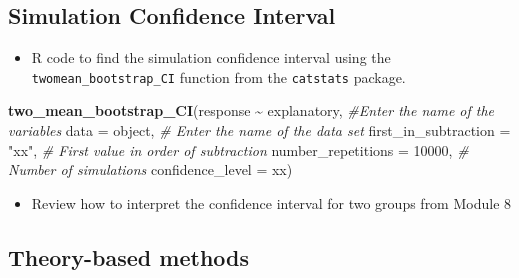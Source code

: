 \documentclass[
]{report}
\newenvironment{Shaded}{\begin{snugshade}}{\end{snugshade}}
\newcommand{\AttributeTok}[1]{\textcolor[rgb]{0.13,0.29,0.53}{#1}}
\newcommand{\CommentTok}[1]{\textcolor[rgb]{0.56,0.35,0.01}{\textit{#1}}}
\newcommand{\DecValTok}[1]{\textcolor[rgb]{0.00,0.00,0.81}{#1}}
\newcommand{\FunctionTok}[1]{\textcolor[rgb]{0.13,0.29,0.53}{\textbf{#1}}}
\newcommand{\NormalTok}[1]{#1}
\newcommand{\SpecialCharTok}[1]{\textcolor[rgb]{0.81,0.36,0.00}{\textbf{#1}}}
\newcommand{\StringTok}[1]{\textcolor[rgb]{0.31,0.60,0.02}{#1}}
\providecommand{\tightlist}{%
  \setlength{\itemsep}{0pt}\setlength{\parskip}{0pt}}
\begin{document}
\subsection*{Simulation Confidence Interval}\label{simulation-confidence-interval}

\begin{itemize}
\tightlist
\item
  R code to find the simulation confidence interval using the \texttt{twomean\_bootstrap\_CI} function from the \texttt{catstats} package.
\end{itemize}

\begin{Shaded}
\begin{Highlighting}[]
\FunctionTok{two\_mean\_bootstrap\_CI}\NormalTok{(response }\SpecialCharTok{\textasciitilde{}}\NormalTok{ explanatory, }\CommentTok{\#Enter the name of the variables}
                      \AttributeTok{data =}\NormalTok{ object,  }\CommentTok{\# Enter the name of the data set}
                      \AttributeTok{first\_in\_subtraction =} \StringTok{"xx"}\NormalTok{, }\CommentTok{\# First value in order of subtraction}
                      \AttributeTok{number\_repetitions =} \DecValTok{10000}\NormalTok{,  }\CommentTok{\# Number of simulations}
                      \AttributeTok{confidence\_level =}\NormalTok{ xx)}
\end{Highlighting}
\end{Shaded}

\begin{itemize}
\tightlist
\item
  Review how to interpret the confidence interval for two groups from Module 8
\end{itemize}

\subsection*{Theory-based methods}\label{theory-based-methods}
\end{document}
